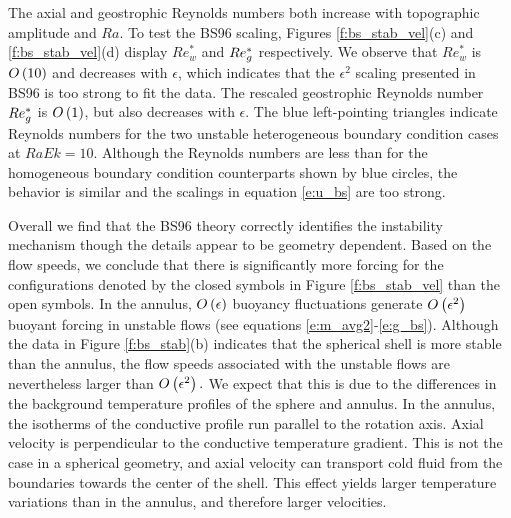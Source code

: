 The axial and geostrophic Reynolds numbers both increase with topographic amplitude and $Ra.$
To test the BS96 scaling, Figures \ref{f:bs_stab_vel}(c) and \ref{f:bs_stab_vel}(d) display $Re_{w}^{*}$ and $Re_{{g}}^{*}$ respectively.
We observe that $Re_{w}^{*}$ is $O\left ( 10\right ) $ and decreases with $\epsilon$, which indicates that the $\epsilon^{2}$ scaling presented in BS96 is too strong to fit the data.
The rescaled geostrophic Reynolds number $Re_{{g}}^{*}$ is $O\left ( 1\right ) $, but also decreases with $\epsilon $.
 The blue left-pointing triangles indicate Reynolds numbers for the two unstable heterogeneous boundary condition cases at $RaEk=10$. Although the Reynolds numbers are less than for the homogeneous boundary condition counterparts shown by blue circles, the behavior is similar and the scalings in equation \eqref{e:u_bs} are too strong.

Overall we find that the BS96 theory correctly identifies the instability mechanism though the details appear to be geometry dependent.
Based on the flow speeds, we conclude that there is significantly more forcing for the configurations denoted by the closed symbols in Figure \ref{f:bs_stab_vel} than the open symbols. 
In the annulus, $O\left ( \epsilon\right ) $ buoyancy fluctuations generate $O\left ( \epsilon^2\right )$ buoyant forcing in unstable flows (see equations \eqref{e:m_avg2}-\eqref{e:g_bs}). 
Although the data in Figure \ref{f:bs_stab}(b) indicates that the spherical shell is more stable than the annulus, the flow speeds associated with the unstable flows are nevertheless larger than $O\left ( \epsilon^{2}\right ).$  
We expect that this is due to the differences in the background temperature profiles of the sphere and annulus. 
In the annulus, the isotherms of the conductive profile run parallel to the rotation axis. 
Axial velocity is perpendicular to the conductive temperature gradient. This is not the case in a spherical geometry, and axial velocity can transport cold fluid from the boundaries towards the center of the shell. 
This effect yields larger temperature variations than in the annulus, and therefore larger velocities.

